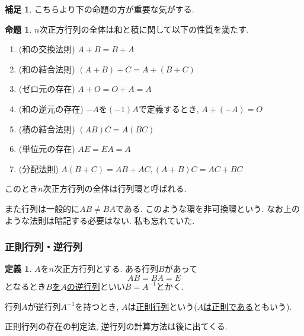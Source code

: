 \documentclass[dvipdfmx,a4paper,11pt]{article} %
\newcommand{\Z}{\mathbb{Z}}
\newcommand{\Q}{\mathbb{Q}}
\theoremstyle{definition}
\newtheorem{prop}[thm]{命題}
\newtheorem{dfn}[thm]{定義}
\newtheorem{rem}[thm]{補足}
\begin{document}
\begin{rem}
こちらより下の命題の方が重要な気がする. 
  \begin{prop}
    \label{prop-2.3}
$n$次正方行列の全体は和と積に関して以下の性質を満たす. 
\begin{enumerate}
\setlength{\parskip}{0cm}
 \setlength{\itemsep}{0pt} 
\item (和の交換法則) $A+B = B+A$
\item (和の結合法則) $(A+B) + C = A + (B+C)$
\item (ゼロ元の存在) $A+O = O+A=A$
\item (和の逆元の存在) $-A$を$(-1)A$で定義するとき, $A + (-A)=O$
\item (積の結合法則) $(AB) C = A (BC)$
\item (単位元の存在) $AE =EA=A$
\item (分配法則) $A(B+C)=AB + AC, (A+B)C = AC + BC$
\end{enumerate}
このとき$n$次正方行列の全体は行列環と呼ばれる.
\end{prop}

 また行列は一般的に$AB \neq BA$である. このような環を非可換環という. 
なお上のような法則は暗記する必要はない. 私も忘れていた.
 \end{rem}
 
 \subsubsection{正則行列・逆行列}
    \begin{dfn}
    \label{dfn-regular}
$A$を$n$次正方行列とする.
 ある行列$B$があって
 $$
 AB =BA =E 
 $$
 となるとき\underline{$B$を$A$の逆行列}といい$B=A^{-1}$とかく.
 
 行列$A$が逆行列$A^{-1}$を持つとき, $A$は\underline{正則行列}という(\underline{$A$は正則である}ともいう).
  \end{dfn}
  正則行列の存在の判定法, 逆行列の計算方法は後に出てくる. 
 
\end{document}
